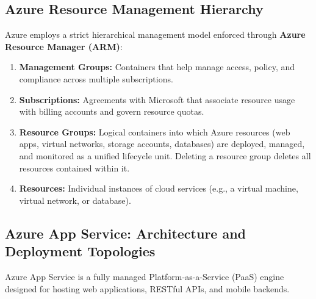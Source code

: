 \documentclass[11pt,a4paper,openany]{report}
\begin{document}
\subsection{Azure Resource Management Hierarchy}
Azure employs a strict hierarchical management model enforced through \textbf{Azure Resource Manager (ARM)}:
\begin{enumerate}[leftmargin=*]
  \item \textbf{Management Groups:} Containers that help manage access, policy, and compliance across multiple subscriptions.
  \item \textbf{Subscriptions:} Agreements with Microsoft that associate resource usage with billing accounts and govern resource quotas.
  \item \textbf{Resource Groups:} Logical containers into which Azure resources (web apps, virtual networks, storage accounts, databases) are deployed, managed, and monitored as a unified lifecycle unit. Deleting a resource group deletes all resources contained within it.
  \item \textbf{Resources:} Individual instances of cloud services (e.g., a virtual machine, virtual network, or database).
\end{enumerate}

\subsection{Azure App Service: Architecture and Deployment Topologies}
Azure App Service is a fully managed Platform-as-a-Service (PaaS) engine designed for hosting web applications, RESTful APIs, and mobile backends.
\end{document}
